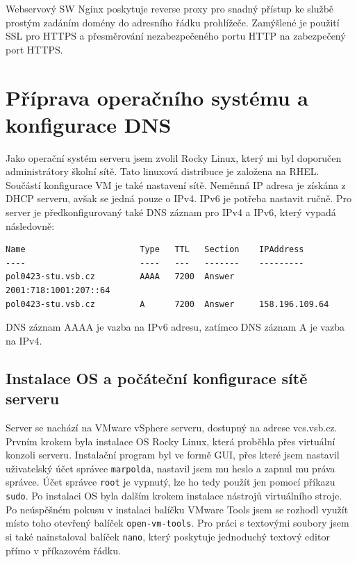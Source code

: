 Webservový SW Nginx poskytuje reverse proxy pro snadný přístup ke službě
prostým zadáním domény do adresního řádku prohlížeče. Zamýšlené je použití
SSL pro HTTPS a přesměrování nezabezpečeného portu HTTP na zabezpečený port
HTTPS.

\section{Příprava operačního systému a konfigurace DNS}
\label{sec:os-preps-dns-config}

Jako operační systém serveru jsem zvolil Rocky Linux,
který mi byl doporučen administrátory školní sítě. Tato linuxová
distribuce je založena na RHEL. Součástí konfigurace VM je také
nastavení sítě. Neměnná IP adresa je získána z DHCP serveru,
avšak se jedná pouze o IPv4. IPv6 je potřeba nastavit ručně.
Pro server je předkonfigurovaný také DNS záznam pro IPv4 a IPv6,
který vypadá následovně:

\begin{verbatim}
Name                       Type   TTL   Section    IPAddress
----                       ----   ---   -------    ---------
pol0423-stu.vsb.cz         AAAA   7200  Answer     2001:718:1001:207::64
pol0423-stu.vsb.cz         A      7200  Answer     158.196.109.64
\end{verbatim}

DNS záznam AAAA je vazba na IPv6 adresu, zatímco DNS záznam A
je vazba na IPv4.

\subsection{Instalace OS a počáteční konfigurace sítě serveru}
\label{sec:os-installation-initial-server-network-config}

Server se nachází na VMware vSphere serveru, dostupný
na adrese vcs.vsb.cz. Prvním krokem byla instalace OS Rocky Linux,
která proběhla přes virtuální konzoli serveru. Instalační program
byl ve formě GUI, přes které jsem nastavil uživatelský účet správce
\texttt{marpolda}, nastavil jsem mu heslo a zapnul mu práva správce.
Účet správce \texttt{root} je vypnutý, lze ho tedy použít jen pomocí
příkazu \texttt{sudo}. Po instalaci OS byla dalším krokem instalace
nástrojů virtuálního stroje. Po neúspěšném pokusu v instalaci balíčku
VMware Tools jsem se rozhodl využít místo toho otevřený balíček
\texttt{open-vm-tools}. Pro práci s textovými soubory jsem si
také nainstaloval balíček \texttt{nano}, který poskytuje jednoduchý
textový editor přímo v příkazovém řádku.

